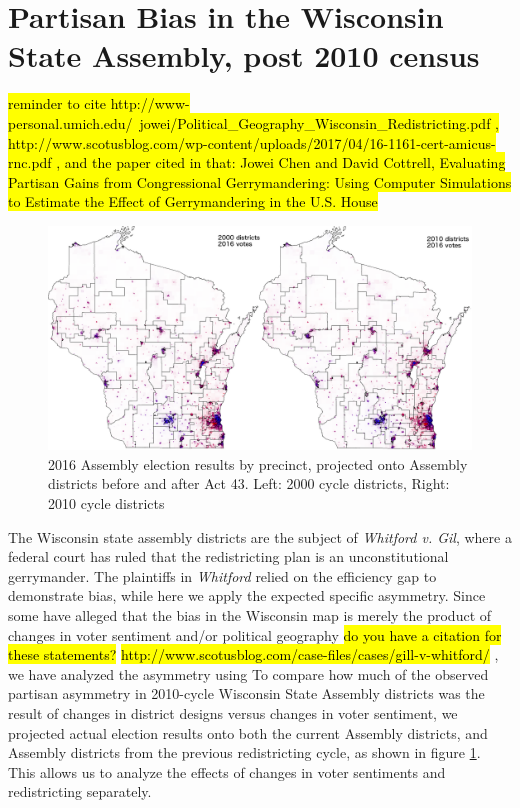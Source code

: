 \documentclass[preprint,12pt]{article}
\newcommand{\CM}[2][green]{ {\sethlcolor{#1} \hl{#2}} }
\newcommand{\KB}[2][cyan]{ {\sethlcolor{#1} \hl{#2}} }
\begin{document}
\section{Partisan Bias in the Wisconsin State Assembly, post 2010 census\label{sec:Wis}}

\KB{reminder to cite http://www-personal.umich.edu/~jowei/Political_Geography_Wisconsin_Redistricting.pdf , http://www.scotusblog.com/wp-content/uploads/2017/04/16-1161-cert-amicus-rnc.pdf ,  and the paper cited in that: Jowei Chen and David Cottrell, Evaluating
Partisan Gains from Congressional
Gerrymandering: Using Computer
Simulations to Estimate the Effect of
Gerrymandering in the U.S. House}

\begin{figure}[htb!]
    \begin{center}
        \includegraphics[scale=0.35]{../Figures/WI_compared/precincts_pop_combined.png}
        \caption{2016 Assembly election results by precinct, projected onto Assembly districts before and after Act 43. Left: 2000 cycle districts, Right: 2010 cycle districts}\label{fig:MapsWI}
    \end{center}
\end{figure}

The Wisconsin state assembly districts are the subject of \emph{Whitford v. Gil}, where a federal court has ruled that the redistricting plan is an unconstitutional gerrymander.
The plaintiffs in \emph{Whitford} relied on the efficiency gap to demonstrate bias, while here we apply the expected specific asymmetry.
Since some have alleged that the bias in the Wisconsin map is merely the product of changes in voter sentiment and/or political geography \CM{do you have a citation for these statements?} \KB{ http://www.scotusblog.com/case-files/cases/gill-v-whitford/ }, we have analyzed the asymmetry using
To compare how much of the observed partisan asymmetry in 2010-cycle Wisconsin State Assembly districts was the result of changes in district designs versus changes in voter sentiment, we projected actual election results onto both the current Assembly districts, and Assembly districts from the previous redistricting cycle, as shown in figure \ref{fig:MapsWI}.
This allows us to analyze the effects of changes in voter sentiments and redistricting separately.
\end{document}
